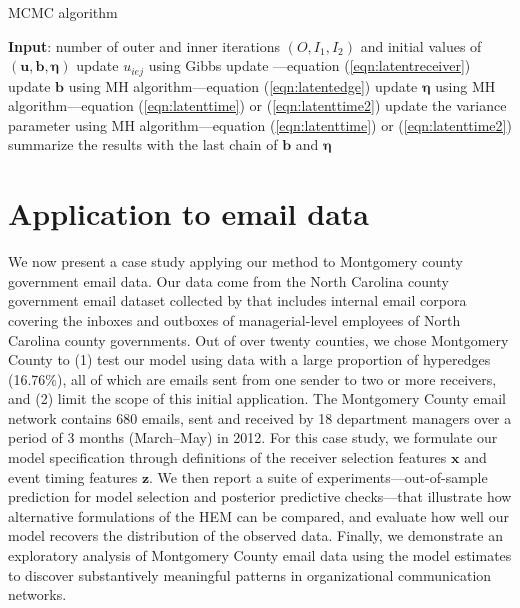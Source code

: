 \documentclass[ba]{imsart}
\def\spacingset#1{\renewcommand{\baselinestretch}%
	{#1}\small\normalsize} \spacingset{1}
\numberwithin{equation}{section}
\theoremstyle{plain}
\begin{document}
		\begin{algorithm}[!t]
			\spacingset{1}
			\SetAlgoLined
			\caption{MCMC algorithm}
			\begin{algorithmic}
				\STATE \textbf{Input}: number of outer and inner iterations $(O, I_1, I_2)$ and initial values of $(\boldsymbol{u}, \boldsymbol{b}, \boldsymbol{\eta})$
				\vskip 0.1in
				\STATE update $u_{iej}$ using Gibbs update ---equation (\ref{eqn:latentreceiver})
				\ENDFOR
				\ENDFOR
				\ENDFOR
				\STATE update $\boldsymbol{b}$ using MH algorithm---equation (\ref{eqn:latentedge})
				\ENDFOR
				\STATE update $\boldsymbol{\eta}$ using MH algorithm---equation (\ref{eqn:latenttime}) or (\ref{eqn:latenttime2}) 
				\ENDFOR
				\STATE update the variance parameter using MH algorithm---equation (\ref{eqn:latenttime}) or (\ref{eqn:latenttime2}) 
				\ENDIF
				\ENDFOR
				\STATE	summarize the results with the last chain of $\boldsymbol{b}$ and $\boldsymbol{\eta}$
			\end{algorithmic}
			\label{alg:MCMC}
		\end{algorithm}


	\section{Application to email data}\label{sec:Emails}
	We now present a case study applying our method to Montgomery county government email data.
	Our data come from the North Carolina county government email dataset collected by \cite{ben2017transparency} that includes internal email corpora covering the inboxes and outboxes of managerial-level employees of North Carolina county governments. Out of over twenty counties, we chose Montgomery County to (1) test our model using data with a large proportion of hyperedges (16.76\%), all of which are emails sent from one sender to two or more receivers, and (2) limit the scope of this initial application. The Montgomery County email network contains 680 emails, sent and received by 18 department managers over a period of 3 months (March--May) in 2012. For this case study,
	we formulate our model specification through definitions of the receiver selection features $\boldsymbol{x}$ and event timing features $\boldsymbol{z}$. We then report a suite of experiments---out-of-sample prediction for model selection and posterior predictive checks---that illustrate how alternative formulations of the HEM can be compared, and evaluate how well our model recovers the distribution of the observed data. Finally, we demonstrate an exploratory analysis of Montgomery County email data using the model estimates to discover substantively meaningful patterns in organizational communication networks.
\end{document}

